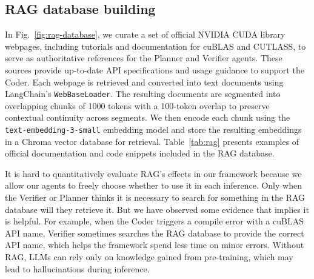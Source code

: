 \subsection{RAG database building}
\label{app:rag}
In Fig.~\ref{fig:rag-database}, we curate a set of official NVIDIA CUDA library webpages, including tutorials and documentation for cuBLAS and CUTLASS, to serve as authoritative references for the Planner and Verifier agents. These sources provide up-to-date API specifications and usage guidance to support the Coder. Each webpage is retrieved and converted into text documents using LangChain’s \texttt{WebBaseLoader}. The resulting documents are segmented into overlapping chunks of 1000 tokens with a 100-token overlap to preserve contextual continuity across segments. We then encode each chunk using the \texttt{text-embedding-3-small} embedding model and store the resulting embeddings in a Chroma vector database for retrieval. Table~\ref{tab:rag} presents examples of official documentation and code snippets included in the RAG database.

It is hard to quantitatively evaluate RAG's effects in our framework because we allow our agents to freely choose whether to use it in each inference. Only when the Verifier or Planner thinks it is necessary to search for something in the RAG database will they retrieve it. But we have observed some evidence that implies it is helpful. For example, when the Coder triggers a compile error with a cuBLAS API name, Verifier sometimes searches the RAG database to provide the correct API name, which helps the framework spend less time on minor errors. Without RAG, LLMs can rely only on knowledge gained from pre-training, which may lead to hallucinations during inference.

